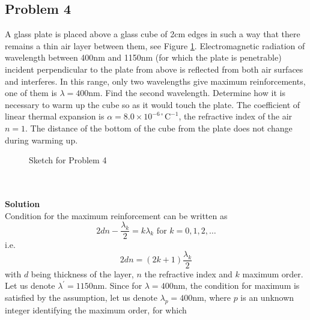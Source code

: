 \documentclass[12pt,a4paper]{book}
\begin{document}
	\subsection*{Problem 4}
	A glass plate is placed above a glass cube of 2cm edges in such a way that there remains a thin air layer between them, see Figure \ref{sketch_3_4_1}. Electromagnetic radiation of wavelength between 400nm and 1150nm (for which the plate is penetrable) incident perpendicular to the plate from above is ref\mbox{}lected from both air surfaces and interferes. In this range, only two wavelengths give maximum reinforcements, one of them is $\lambda=400\text{nm}$. Find the second wavelength. Determine how it is necessary to warm up the cube so as it would touch the plate. The coef\mbox{}f\mbox{}icient of linear thermal expansion is $\alpha=8.0\times10^{-6\circ}\mathrm{C}^{-1}$, the refractive index of the air $n=1$. The distance of the bottom of the cube from the plate does not change during warming up.
	\begin{figure}
		[!hbtp]
		\centering
		\caption{Sketch for Problem 4}
		\label{sketch_3_4_1}
	\end{figure}\\ \\
	\textbf{Solution}\\
	Condition for the maximum reinforcement can be written as
	\begin{equation*}
		2dn-\frac{\lambda_k}{2}=k\lambda_k\text{ for }k=0,1,2,\dots
	\end{equation*}
	i.e.
	\begin{equation}
		2dn=(2k+1)\frac{\lambda_k}{2}
		\label{3.4.condition1}
	\end{equation}
	with $d$ being thickness of the layer, $n$ the refractive index and $k$ maximum order. Let us denote $\lambda^{'}=1150\text{nm}$. Since for $\lambda=400\text{nm}$, the condition for maximum is satisf\mbox{}ied by the assumption, let us denote $\lambda_p=400\text{nm}$, where $p$ is an unknown integer identifying the maximum order, for which
\end{document}
